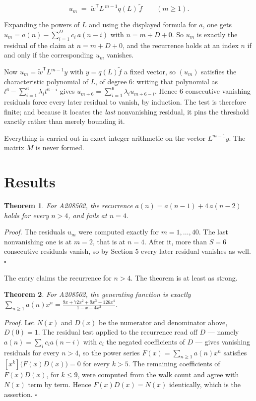 \documentclass[11pt]{article}
\newtheorem{theorem}{Theorem}
\theoremstyle{definition}
\begin{document}
\[u_m \;=\; \tilde w^{\mathsf T} L^{\,m-1} q(L)\,\tilde f \qquad (m \ge 1).\]

Expanding the powers of $L$ and using the displayed formula for $a$, one gets $u_m = a(n) - \sum_{i=1}^{D} c_i\,a(n-i)$ with $n = m + D + 0$. So $u_m$ is exactly the residual of the claim at $n = m + D + 0$, and the recurrence holds at an index $n$ if and only if the corresponding $u_m$ vanishes.

Now $u_m = \tilde w^{\mathsf T} L^{m-1} y$ with $y = q(L)\tilde f$ a fixed vector, so $(u_m)$ satisfies the characteristic polynomial of $L$, of degree $6$: writing that polynomial as $t^{6} - \sum_{i=1}^{6} \lambda_i t^{6-i}$ gives $u_{m+6} = \sum_{i=1}^{6} \lambda_i u_{m+6-i}$. Hence $6$ consecutive vanishing residuals force every later residual to vanish, by induction. The test is therefore finite; and because it locates the {\itshape last} nonvanishing residual, it pins the threshold exactly rather than merely bounding it.

Everything is carried out in exact integer arithmetic on the vector $L^{m-1}y$. The matrix $M$ is never formed.

\section{Results}

\begin{theorem} For A208502, the recurrence $a(n) = a(n-1) + 4\,a(n-2)$ holds for every $n > 4$, and fails at $n = 4$.\end{theorem}

{\itshape Proof.} The residuals $u_m$ were computed exactly for $m = 1,\dots,40$. The last nonvanishing one is at $m = 2$, that is at $n = 4$. After it, more than $S = 6$ consecutive residuals vanish, so by Section 5 every later residual vanishes as well. $\square$

The entry claims the recurrence for $n > 4$. The theorem is at least as strong.

\begin{theorem} For A208502, the generating function is exactly $\sum_{n\ge 1} a(n)x^n = \frac{9x + 72x^{2} + 9x^{3} - 126x^{4}}{1 - x - 4x^{2}}$.\end{theorem}

{\itshape Proof.} Let $N(x)$ and $D(x)$ be the numerator and denominator above, $D(0)=1$. The residual test applied to the recurrence read off $D$ --- namely $a(n) = \sum_i c_i a(n-i)$ with $c_i$ the negated coefficients of $D$ --- gives vanishing residuals for every $n > 4$, so the power series $F(x)=\sum_{n\ge 1}a(n)x^n$ satisfies $[x^k]\bigl(F(x)D(x)\bigr) = 0$ for every $k > 5$. The remaining coefficients of $F(x)D(x)$, for $k \le 9$, were computed from the walk count and agree with $N(x)$ term by term. Hence $F(x)D(x) = N(x)$ identically, which is the assertion. $\square$
\end{document}

